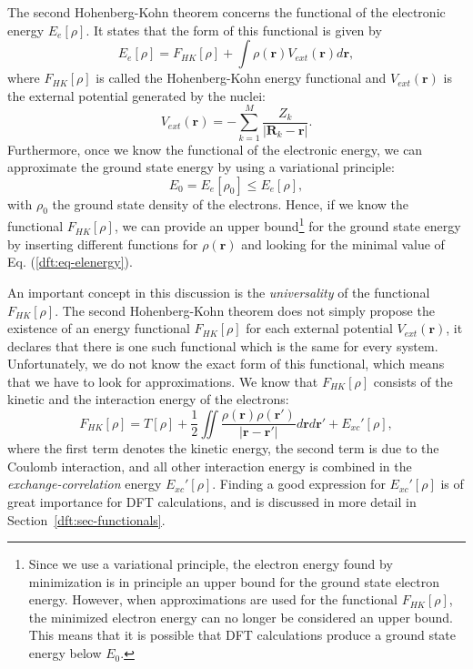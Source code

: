 \begin{refsection}
The second Hohenberg-Kohn theorem concerns the functional of the electronic 
energy $E_e[\rho]$. It states that the form of this functional is given by 
\begin{equation}\label{dft:eq-elenergy} 
E_e[\rho] = F_{HK}[\rho] + \int \rho(\mathbf{r}) V_{ext}(\mathbf{r}) 
d\mathbf{r}, 
\end{equation} 
where $F_{HK}[\rho]$ is called the Hohenberg-Kohn energy functional and 
$V_{ext}(\mathbf{r})$ is the external potential generated by the nuclei: 
\begin{equation} 
V_{ext}(\mathbf{r}) =  - \sum_{k=1}^M 
\frac{Z_k}{\left|\mathbf{R}_{k}-\mathbf{r}\right|}. 
\end{equation} 
Furthermore, once we know the functional of the electronic energy, we can 
approximate the ground state energy by using a variational principle: 
\begin{equation} 
E_0 = E_e[\rho_0] \leq E_e[\rho], 
\end{equation} 
with $\rho_0$ the ground state density of the electrons. Hence, if we know the 
functional $F_{HK}[\rho]$, we can provide an upper bound\footnote{Since we use 
a variational principle, the electron energy found by minimization is in 
principle an upper bound for the ground state electron energy. However, when 
approximations are used for the functional $F_{HK}[\rho]$, the minimized 
electron energy can no longer be considered an upper bound. This means that it 
is possible that DFT calculations produce a ground state energy below $E_0$.} 
for the ground state energy by inserting different functions for 
$\rho(\mathbf{r})$ and looking for the minimal value of Eq. 
(\ref{dft:eq-elenergy}). 
 
An important concept in this discussion is the \textit{universality} of the functional 
$F_{HK}[\rho]$. The second Hohenberg-Kohn theorem does not simply propose the 
existence of an energy functional $F_{HK}[\rho]$ for each external potential 
$V_{ext}(\mathbf{r})$, it declares that there is one such functional which is 
the same for every system. Unfortunately, we do not know the exact form of 
this functional, which means that we have to look for approximations. We know 
that $F_{HK}[\rho]$ consists of the kinetic and the interaction energy of the 
electrons: 
\begin{equation}\label{dft:eq-HKfunctional} 
F_{HK}[\rho] = T[\rho] + \frac{1}{2} \iint 
\frac{\rho(\mathbf{r})\rho(\mathbf{r'})}{\left| \mathbf{r} - 
\mathbf{r'}\right|} d\mathbf{r} d\mathbf{r'} + E_{xc}'[\rho],  
\end{equation} 
where the first term denotes the kinetic energy, the second term is due to the 
Coulomb interaction, and all other interaction energy is combined in the 
\textit{exchange-correlation} energy $E_{xc}'[\rho]$. Finding a good 
expression for $E_{xc}'[\rho]$ is of great importance for DFT calculations, 
and is discussed in more detail in Section~\ref{dft:sec-functionals}. 
 

\end{refsection}
